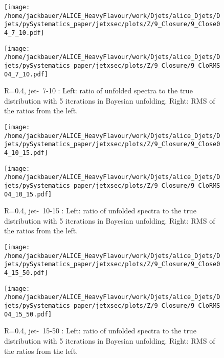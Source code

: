 \begin{figure}
\centering
\begin{minipage}{.5\textwidth}
  \centering
  \texttt{[image: /home/jackbauer/ALICE\_HeavyFlavour/work/Djets/alice\_Djets/Djets/pySystematics\_paper/jetxsec/plots/Z/9\_Closure/9\_Close04\_7\_10.pdf]}
\end{minipage}%
\begin{minipage}{.5\textwidth}
  \centering
  \texttt{[image: /home/jackbauer/ALICE\_HeavyFlavour/work/Djets/alice\_Djets/Djets/pySystematics\_paper/jetxsec/plots/Z/9\_Closure/9\_CloRMS04\_7\_10.pdf]}
\end{minipage}
  \caption{R=0.4, jet-\pt\ 7-10 \GeVc: Left: ratio of unfolded spectra to the true distribution with 5 iterations in Bayesian unfolding. Right: RMS of the ratios from the left.}
  \label{fig:UnfClosZchR04_7_10}
\end{figure}
\begin{figure}
\centering
\begin{minipage}{.5\textwidth}
  \centering
  \texttt{[image: /home/jackbauer/ALICE\_HeavyFlavour/work/Djets/alice\_Djets/Djets/pySystematics\_paper/jetxsec/plots/Z/9\_Closure/9\_Close04\_10\_15.pdf]}
\end{minipage}%
\begin{minipage}{.5\textwidth}
  \centering
  \texttt{[image: /home/jackbauer/ALICE\_HeavyFlavour/work/Djets/alice\_Djets/Djets/pySystematics\_paper/jetxsec/plots/Z/9\_Closure/9\_CloRMS04\_10\_15.pdf]}
\end{minipage}
  \caption{R=0.4, jet-\pt\ 10-15 \GeVc: Left: ratio of unfolded spectra to the true distribution with 5 iterations in Bayesian unfolding. Right: RMS of the ratios from the left.}
  \label{fig:UnfClosZchR04_10_15}
\end{figure}
\begin{figure}
\centering
\begin{minipage}{.5\textwidth}
  \centering
  \texttt{[image: /home/jackbauer/ALICE\_HeavyFlavour/work/Djets/alice\_Djets/Djets/pySystematics\_paper/jetxsec/plots/Z/9\_Closure/9\_Close04\_15\_50.pdf]}
\end{minipage}%
\begin{minipage}{.5\textwidth}
  \centering
  \texttt{[image: /home/jackbauer/ALICE\_HeavyFlavour/work/Djets/alice\_Djets/Djets/pySystematics\_paper/jetxsec/plots/Z/9\_Closure/9\_CloRMS04\_15\_50.pdf]}
\end{minipage}
  \caption{R=0.4, jet-\pt\ 15-50 \GeVc: Left: ratio of unfolded spectra to the true distribution with 5 iterations in Bayesian unfolding. Right: RMS of the ratios from the left.}
  \label{fig:UnfClosZchR04_15_50}
\end{figure}
